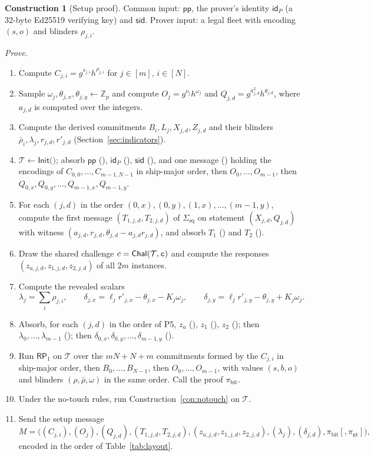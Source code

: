 \documentclass[11pt]{article}
\theoremstyle{definition}
\newtheorem{construction}[lemma]{Construction}
\theoremstyle{remark}
\newcommand{\Z}{\mathbb{Z}}
\newcommand{\sid}{\mathsf{sid}}
\newcommand{\id}{\mathsf{id}}
\newcommand{\pp}{\mathsf{pp}}
\newcommand{\RP}{\mathsf{RP}}
\newcommand{\Sq}{\Sigma_{\mathrm{sq}}}
\newcommand{\tr}{\mathcal{T}}
\newcommand{\lbl}[1]{\text{\texttt{#1}}}
\begin{document}
\begin{construction}[Setup proof]\label{con:setup}
Common input: $\pp$, the prover's identity $\id_P$ (a 32-byte Ed25519 verifying key) and $\sid$. Prover input: a legal fleet with encoding $(s,o)$ and blinders $\rho_{j,i}$.

\emph{Prove.}
\begin{enumerate}[label=P\arabic*.]
  \item\label{step:P1} Compute $C_{j,i}=g^{s_{j,i}}h^{\rho_{j,i}}$ for $j\in[m]$, $i\in[N]$.
  \item\label{step:P2} Sample $\omega_j,\theta_{j,x},\theta_{j,y}\gets\Z_p$ and compute $O_j=g^{o_j}h^{\omega_j}$ and $Q_{j,d}=g^{a_{j,d}^2}h^{\theta_{j,d}}$, where $a_{j,d}$ is computed over the integers.
  \item\label{step:P3} Compute the derived commitments $B_i,L_j,X_{j,d},Z_{j,d}$ and their blinders $\bar\rho_i,\lambda_j,r_{j,d},r'_{j,d}$ (Section~\ref{sec:indicators}).
  \item\label{step:P4} $\tr\gets\mathsf{Init}($$)$; absorb $\pp$ (), $\id_P$ (), $\sid$ (), and one message () holding the encodings of $C_{0,0},\ldots,C_{m-1,N-1}$ in ship-major order, then $O_0,\ldots,O_{m-1}$, then $Q_{0,x},Q_{0,y},\ldots,Q_{m-1,x},Q_{m-1,y}$.
  \item\label{step:P5} For each $(j,d)$ in the order $(0,x),(0,y),(1,x),\ldots,(m-1,y)$, compute the first message $(T_{1,j,d},T_{2,j,d})$ of $\Sq$ on statement $(X_{j,d},Q_{j,d})$ with witness $(a_{j,d},r_{j,d},\theta_{j,d}-a_{j,d}r_{j,d})$, and absorb $T_1$ () and $T_2$ ().
  \item\label{step:P6} Draw the shared challenge $c=\mathsf{Chal}(\tr,\lbl{c})$ and compute the responses $(z_{a,j,d},z_{1,j,d},z_{2,j,d})$ of all $2m$ instances.
  \item\label{step:P7} Compute the revealed scalars
  \[
    \lambda_j=\sum_i\rho_{j,i},\qquad
    \delta_{j,x}=\ell_jr'_{j,x}-\theta_{j,x}-K_j\omega_j,\qquad
    \delta_{j,y}=\ell_jr'_{j,y}-\theta_{j,y}+K_j\omega_j.
  \]
  \item\label{step:P8} Absorb, for each $(j,d)$ in the order of P5, $z_a$ (), $z_1$ (), $z_2$ (); then $\lambda_0,\ldots,\lambda_{m-1}$ (); then $\delta_{0,x},\delta_{0,y},\ldots,\delta_{m-1,y}$ ().
  \item\label{step:P9} Run $\RP_1$ on $\tr$ over the $mN+N+m$ commitments formed by the $C_{j,i}$ in ship-major order, then $B_0,\ldots,B_{N-1}$, then $O_0,\ldots,O_{m-1}$, with values $(s,b,o)$ and blinders $(\rho,\bar\rho,\omega)$ in the same order. Call the proof $\pi_{\mathrm{bit}}$.
  \item\label{step:P10} Under the no-touch rules, run Construction~\ref{con:notouch} on $\tr$.
  \item\label{step:P11} Send the setup message
  \[
    M=\bigl((C_{j,i}),(O_j),(Q_{j,d}),(T_{1,j,d},T_{2,j,d}),(z_{a,j,d},z_{1,j,d},z_{2,j,d}),(\lambda_j),(\delta_{j,d}),\pi_{\mathrm{bit}}[,\pi_{\mathrm{nt}}]\bigr),
  \]
  encoded in the order of Table~\ref{tab:layout}.
\end{enumerate}


\end{construction}
\end{document}
